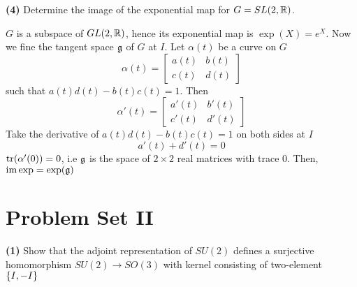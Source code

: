 \documentclass{article}
\begin{document}
\textbf{(4)} Determine the image of the exponential map for $G = SL(2, \mathbb{R})$.

\begin{longproof}
$G$ is a subspace of $GL(2, \mathbb{R})$, hence its exponential map is $\exp(X) = e^X$. Now we fine the tangent space $\mathfrak{g}$ of $G$ at $I$. Let $\alpha(t)$ be a curve on $G$
$$
    \alpha(t) = \begin{bmatrix}
        a(t) & b(t) \\
        c(t) & d(t)
    \end{bmatrix}
$$
such that $a(t) d(t) - b(t) c(t) = 1$. Then
$$
    \alpha'(t) = \begin{bmatrix}
        a'(t) & b'(t) \\
        c'(t) & d'(t)
    \end{bmatrix}
$$
Take the derivative of $a(t) d(t) - b(t) c(t) = 1$ on both sides at $I$
$$
    a'(t) + d'(t) = 0
$$
$\operatorname{tr}(\alpha'(0)) = 0$, i.e $\mathfrak{g}$ is the space of $2 \times 2$ real matrices with trace $0$. Then, $\operatorname{im} \exp = \exp(\mathfrak{g})$

\end{longproof}

\section{Problem Set II}
\textbf{(1)} Show that the adjoint representation of $SU(2)$ defines a surjective homomorphism $SU(2) \to SO(3)$ with kernel consisting of two-element $\{I, -I\}$
\end{document}
